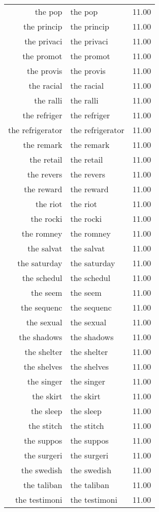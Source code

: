 \begin{table}[ht]
\begin{tabular}{rlr}
  the pop & the pop & 11.00 \\ 
  the princip & the princip & 11.00 \\ 
  the privaci & the privaci & 11.00 \\ 
  the promot & the promot & 11.00 \\ 
  the provis & the provis & 11.00 \\ 
  the racial & the racial & 11.00 \\ 
  the ralli & the ralli & 11.00 \\ 
  the refriger & the refriger & 11.00 \\ 
  the refrigerator & the refrigerator & 11.00 \\ 
  the remark & the remark & 11.00 \\ 
  the retail & the retail & 11.00 \\ 
  the revers & the revers & 11.00 \\ 
  the reward & the reward & 11.00 \\ 
  the riot & the riot & 11.00 \\ 
  the rocki & the rocki & 11.00 \\ 
  the romney & the romney & 11.00 \\ 
  the salvat & the salvat & 11.00 \\ 
  the saturday & the saturday & 11.00 \\ 
  the schedul & the schedul & 11.00 \\ 
  the seem & the seem & 11.00 \\ 
  the sequenc & the sequenc & 11.00 \\ 
  the sexual & the sexual & 11.00 \\ 
  the shadows & the shadows & 11.00 \\ 
  the shelter & the shelter & 11.00 \\ 
  the shelves & the shelves & 11.00 \\ 
  the singer & the singer & 11.00 \\ 
  the skirt & the skirt & 11.00 \\ 
  the sleep & the sleep & 11.00 \\ 
  the stitch & the stitch & 11.00 \\ 
  the suppos & the suppos & 11.00 \\ 
  the surgeri & the surgeri & 11.00 \\ 
  the swedish & the swedish & 11.00 \\ 
  the taliban & the taliban & 11.00 \\ 
  the testimoni & the testimoni & 11.00 \\ 

\end{tabular}
\end{table}

